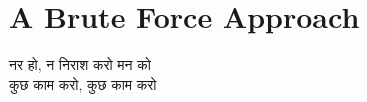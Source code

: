 \part{A Brute Force Approach}
\large{\begin{hindi}
नर हो, न निराश करो मन को \\
कुछ काम करो, कुछ काम करो
\end{hindi}}


